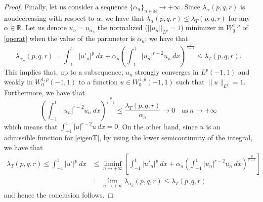 \documentclass{amsart}
\theoremstyle{definition}
\theoremstyle{remark}
\newcommand{\R}{\mathbb{R}}
\newcommand{\N}{\mathbb{N}}
\begin{document}
\begin{proof}
Finally, let us consider a sequence $\{\alpha_n\}_{n\in\N}\to+\infty$.
Since $\lambda_\alpha ( p,q, r)$ is nondecreasing with respect to $\alpha$, we have that $\lambda_\alpha(p,q,r)\le\lambda_T(p,q,r)$ for any $\alpha\in\R$. Let us denote $u_{n}=u_{\alpha_n}$ the normalized ($||u_{n}||_{L^q}=1$) minimizer in $W_0^{1,p}$ of \eqref{operat} when the value of the parameter is $\alpha_n$; we have that
\begin{equation*}
\lambda_{\alpha_n} (p,q,r)=\int_{-1}^{1} |u'_n|^p\  dx + \alpha_n\left(\int_{-1}^{1} |u_n|^{r-2}u_n \  dx\right)^\frac{p}{r-1}\leq\lambda_T(p,q,r).
\end{equation*}
This implies that, up to a subsequence, $u_n$ strongly converges in $L^p(-1,1)$ and weakly in $W_0^{1,p}(-1,1)$ to a function $u\in W_0^{1,p}(-1,1)$ such that $\|u\|_{L^q}=1$. Furthermore, we have that 
\begin{equation*}
\left( \int_{-1}^{1} |u_n|^{r-2}u_n \  dx\right)^\frac{p}{r-1}\leq\frac{ \lambda_T(p,q,r)}{\alpha_n}\rightarrow 0 \quad\text{as}\ n\rightarrow + \infty
\end{equation*}
which means that $\int_{-1}^1 |u|^{r-2}u\  dx=0$. On the other hand, %
 since $u$ is an admissible function for \eqref{eigenT}, by using the lower semicontinuity of the integral, we have that
\begin{equation*}
\begin{split}
\lambda_T(p,q,r)\le
\int_{-1}^{1} |u'|^p\  dx &\leq \liminf_{n \rightarrow +\infty}\left[\int_{-1}^{1} |u'_n|^p\  dx
+ \alpha_n\left( \int_{-1}^{1} |u_n|^{r-2}u_n \  dx\right)^\frac{p}{r-1}\right]\\
&=\lim_{n \rightarrow + \infty}\lambda_{\alpha_n}(p,q,r)\leq\lambda_T(p,q,r)
\end{split}
\end{equation*}
and hence the conclusion follows.%
\end{proof}
\end{document}
